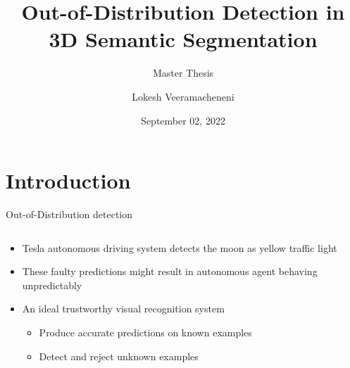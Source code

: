 \documentclass[aspectratio=169]{beamer}
\author[Veeramacheneni]{Lokesh Veeramacheneni}
\title{Out-of-Distribution Detection in 3D Semantic Segmentation}
\subtitle{Master Thesis}
\institute[HBRS]{Hochschule Bonn-Rhein-Sieg}
\date{September 02, 2022}
\begin{document}
{
\begin{frame}
\titlepage
\end{frame}
}

\section{Introduction}
\begin{frame}{Out-of-Distribution detection}
    \begin{columns}
        \begin{column}{0.5\textwidth}
            \begin{itemize}
                \item Tesla autonomous driving system detects the moon as yellow traffic light
                \item These faulty predictions might result in autonomous agent behaving unpredictably
                \item An ideal trustworthy visual recognition system
                \begin{itemize}
                    \item Produce accurate predictions on known examples
                    \item Detect and reject unknown examples
                \end{itemize}
            \end{itemize}
        \end{column}
        \begin{column}{0.5\textwidth}
            

\end{column}
\end{columns}
\end{frame}
\end{document}
